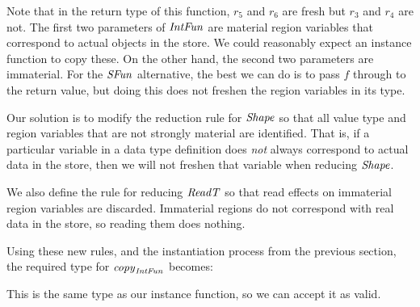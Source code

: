 
\bigskip
Note that in the return type of this function, $r_5$ and $r_6$ are fresh but $r_3$ and $r_4$ are not. The first two parameters of $\operatorname{\mathit{IntFun}}$ are material region variables that correspond to actual objects in the store. We could reasonably expect an instance function to copy these. On the other hand, the second two parameters are immaterial. For the $\operatorname{\mathit{SFun}}$ alternative, the best we can do is to pass $f$ through to the return value, but doing this does not freshen the region variables in its type.

Our solution is to modify the reduction rule for $\operatorname{\mathit{Shape}}$ so that all value type and region variables that are not strongly material are identified. That is, if a particular variable in a data type definition does \emph{not} always correspond to actual data in the store, then we will not freshen that variable when reducing $\operatorname{\mathit{Shape}}$.

We also define the rule for reducing $\operatorname{\mathit{ReadT}}$ so that read effects on immaterial region variables are discarded. Immaterial regions do not correspond with real data in the store, so reading them does nothing. 

Using these new rules, and the instantiation process from the previous section, the required type for $\operatorname{\mathit{copy}}_{\operatorname{\mathit{IntFun}}}$ becomes:


This is the same type as our instance function, so we can accept it as valid.


